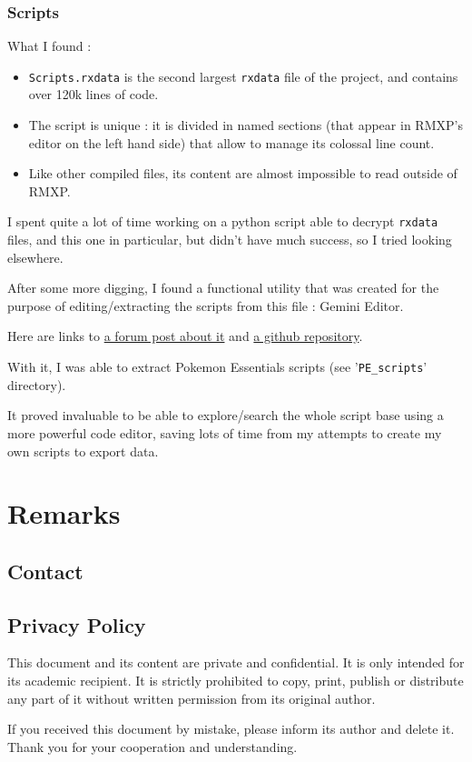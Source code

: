 \documentclass[11pt]{article}
\begin{document}
\subsubsection{Scripts}



What I found :
\begin{itemize}
	\item \verb|Scripts.rxdata| is the second largest \verb|rxdata| file of the project, and contains over 120k lines of code.
	
	\item The script is unique : it is divided in named sections (that appear in RMXP's editor on the left hand side) that allow to manage its colossal line count.
	
	\item Like other compiled files, its content are almost impossible to read outside of RMXP.
\end{itemize}

I spent quite a lot of time working on a python script able to decrypt \verb|rxdata| files, and this one in particular, but didn't have much success, so I tried looking elsewhere.

After some more digging, I found a functional utility that was created for the purpose of editing/extracting the scripts from this file : Gemini Editor.

Here are links to \href{https://forum.chaos-project.com/index.php/topic,10420.0.html}{a forum post about it} and \href{https://github.com/terabin/Gemini}{a github repository}.

With it, I was able to extract Pokemon Essentials scripts (see '\verb|PE_scripts|' directory).

It proved invaluable to be able to explore/search the whole script base using a more powerful code editor, saving lots of time from my attempts to create my own scripts to export data.










\newpage
\section{Remarks}

\subsection{Contact}


\subsection{Privacy Policy}
\label{sec:privacypolice}

This document and its content are private and confidential. It is only intended for its academic recipient. It is strictly prohibited to copy, print, publish or distribute any part of it without written permission from its original author.

If you received this document by mistake, please inform its author and delete it. Thank you for your cooperation and understanding.
\end{document}
